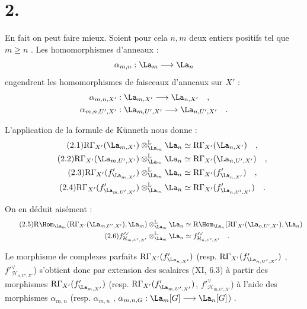 \section*{2.}
En fait on peut faire mieux. Soient pour cela $n,m$ deux entiers positifs tel que $m \geq n$ . Les homomorphismes d'anneaux :
\[
\alpha_{m,n} : \La_m \longrightarrow \La_n
\]
engendrent les homomorphismes de faisceaux d'anneaux sur $X'$ :
\begin{align*}
\alpha_{m,n,X'} &: \La_{m,X'} \longrightarrow \La_{n,X'} \quad , \\
\alpha_{m,n,U',X'} &: \La_{m,U',X'} \longrightarrow \La_{n,U',X'} \quad .
\end{align*}

L'application de la formule de Künneth nous donne :
\begin{align}
\tag{2.1} \mathrm{R}\Gamma_{X'}(\La_{m,X'}) \otimes_{\La_m}^{\mathbb{L}} \La_n &\simeq \mathrm{R}\Gamma_{X'}(\La_{n,X'}) \quad , \\
\tag{2.2} \mathrm{R}\Gamma_{X'}(\La_{m,U',X'}) \otimes_{\La_m}^{\mathbb{L}} \La_n &\simeq \mathrm{R}\Gamma_{X'}(\La_{n,U',X'}) \quad , \\
\tag{2.3} \mathrm{R}\Gamma_{X'}(f'_{\La_{m,X'}}) \otimes_{\La_m}^{\mathbb{L}} \La_n &\simeq \mathrm{R}\Gamma_{X'}(f'_{\La_{n,X'}}) \quad , \\
\tag{2.4} \mathrm{R}\Gamma_{X'}(f'_{\La_{m,U',X'}}) \otimes_{\La_m}^{\mathbb{L}} \La_n &\simeq \mathrm{R}\Gamma_{X'}(f'_{\La_{n,U',X'}}) \quad .
\end{align}

On en déduit aisément :
\begin{align}
\tag{2.5} \mathrm{R}\Hom_{\La_m}(\mathrm{R}\Gamma_{X'}(\La_{m,U',X'}), \La_m) \otimes_{\La_m}^{\mathbb{L}} \La_n &\simeq \mathrm{R}\Hom_{\La_n}(\mathrm{R}\Gamma_{X'}(\La_{n,U',X'}), \La_n) \\
\tag{2.6} f'^\vee_{\mathcal{H}_{m,U',X'}} \otimes_{\La_m}^{\mathbb{L}} \La_n &\simeq f'^\vee_{\mathcal{H}_{n,U',X'}} \quad .
\end{align}

Le morphisme de complexes parfaits $\mathrm{R}\Gamma_{X'}(f'_{\La_{n,X'}})$ (resp. $\mathrm{R}\Gamma_{X'}(f'_{\La_{n,U',X'}})$ , $f'^\vee_{\mathcal{H}_{n,U',X'}}$) s'obtient donc par extension des scalaires (XI, 6.3) à partir des morphismes $\mathrm{R}\Gamma_{X'}(f'_{\La_{m,X'}})$ (resp. $\mathrm{R}\Gamma_{X'}(f'_{\La_{m,U',X'}})$, $f'^\vee_{\mathcal{H}_{m,U',X'}}$) 
à l'aide des morphismes $\alpha_{m,n}$ (resp. $\alpha_{m,n}$ , $\alpha_{m,n,G} : \La_m[G] \longrightarrow \La_n[G]$) .

